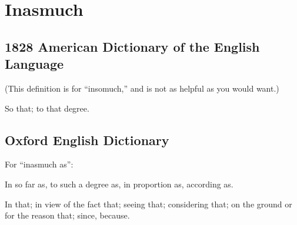 \section{Inasmuch}
	\label{INASMUCH}
	

\subsection{1828 American Dictionary of the English Language} %
	\label{INASMUCH-1828}

	(This definition is for ``insomuch,'' and is not as helpful as you would want.)

	\begin{compactenum}
		\item So that; to that degree.
	\end{compactenum}

\subsection{Oxford English Dictionary} %
	\label{INASMUCH-OED}

	For ``inasmuch as'':

	\begin{compactitem}
		\item[I.1] In so far as, to such a degree as, in proportion as, according as.
		\item[I.2] In that; in view of the fact that; seeing that; considering that; on the ground or for the reason that; since, because.
	\end{compactitem}


	
